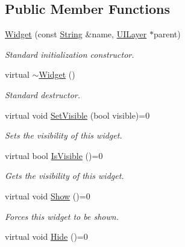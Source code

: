 \subsection*{Public Member Functions}
\begin{DoxyCompactItemize}
\item 
\hyperlink{classphys_1_1UI_1_1Widget_a270ffcb858d43bbf94b0ce2089a10607}{Widget} (const \hyperlink{namespacephys_aa03900411993de7fbfec4789bc1d392e}{String} \&name, \hyperlink{classphys_1_1UILayer}{UILayer} $\ast$parent)
\begin{DoxyCompactList}\small\item\em Standard initialization constructor. \item\end{DoxyCompactList}\item 
\hypertarget{classphys_1_1UI_1_1Widget_a95bde61e93544334b376938274617d15}{
virtual \hyperlink{classphys_1_1UI_1_1Widget_a95bde61e93544334b376938274617d15}{$\sim$Widget} ()}
\label{d9/d48/classphys_1_1UI_1_1Widget_a95bde61e93544334b376938274617d15}

\begin{DoxyCompactList}\small\item\em Standard destructor. \item\end{DoxyCompactList}\item 
virtual void \hyperlink{classphys_1_1UI_1_1Widget_ab049233d8d5522a6ab42654b8924a3e0}{SetVisible} (bool visible)=0
\begin{DoxyCompactList}\small\item\em Sets the visibility of this widget. \item\end{DoxyCompactList}\item 
virtual bool \hyperlink{classphys_1_1UI_1_1Widget_aaf1a1bd31b8e626467ce9cdb69bdf7ac}{IsVisible} ()=0
\begin{DoxyCompactList}\small\item\em Gets the visibility of this widget. \item\end{DoxyCompactList}\item 
\hypertarget{classphys_1_1UI_1_1Widget_aa53e64903afc4a1fecd066c814b6c8d4}{
virtual void \hyperlink{classphys_1_1UI_1_1Widget_aa53e64903afc4a1fecd066c814b6c8d4}{Show} ()=0}
\label{d9/d48/classphys_1_1UI_1_1Widget_aa53e64903afc4a1fecd066c814b6c8d4}

\begin{DoxyCompactList}\small\item\em Forces this widget to be shown. \item\end{DoxyCompactList}\item 
\hypertarget{classphys_1_1UI_1_1Widget_abc8e3f88f780e3b36b38086c45311795}{
virtual void \hyperlink{classphys_1_1UI_1_1Widget_abc8e3f88f780e3b36b38086c45311795}{Hide} ()=0}
\label{d9/d48/classphys_1_1UI_1_1Widget_abc8e3f88f780e3b36b38086c45311795}


\end{DoxyCompactItemize}

